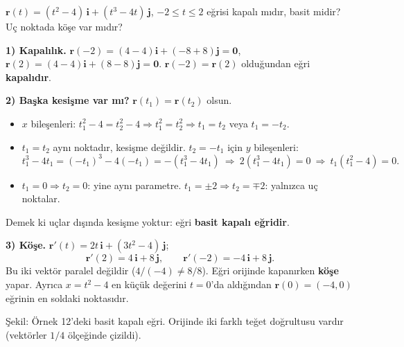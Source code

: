 \begin{soru}
$\mathbf r(t)=(t^2-4)\,\mathbf i+(t^3-4t)\,\mathbf j$, $-2\le t\le2$ eğrisi kapalı mıdır, basit midir? Uç noktada köşe var mıdır?
\end{soru}
\begin{cevap}
\textbf{1) Kapalılık.} $\mathbf r(-2)=(4-4)\mathbf i+(-8+8)\mathbf j=\mathbf 0$, \ $\mathbf r(2)=(4-4)\mathbf i+(8-8)\mathbf j=\mathbf 0$.
$\mathbf r(-2)=\mathbf r(2)$ olduğundan eğri \textbf{kapalıdır}.

\textbf{2) Başka kesişme var mı?} $\mathbf r(t_1)=\mathbf r(t_2)$ olsun.
\begin{itemize}
\item $x$ bileşenleri: $t_1^2-4=t_2^2-4\Rightarrow t_1^2=t_2^2\Rightarrow t_1=t_2$ veya $t_1=-t_2$.
\item $t_1=t_2$ aynı noktadır, kesişme değildir. $t_2=-t_1$ için $y$ bileşenleri:
\[ t_1^3-4t_1=(-t_1)^3-4(-t_1)=-(t_1^3-4t_1)\ \Rightarrow\ 2(t_1^3-4t_1)=0\ \Rightarrow\ t_1(t_1^2-4)=0 . \]
\item $t_1=0\Rightarrow t_2=0$: yine aynı parametre. $t_1=\pm2\Rightarrow t_2=\mp2$: yalnızca uç noktalar.
\end{itemize}
Demek ki uçlar dışında kesişme yoktur: eğri \textbf{basit kapalı eğridir}.

\textbf{3) Köşe.} $\mathbf r'(t)=2t\,\mathbf i+(3t^2-4)\,\mathbf j$;
\[ \mathbf r'(2)=4\,\mathbf i+8\,\mathbf j,\qquad \mathbf r'(-2)=-4\,\mathbf i+8\,\mathbf j . \]
Bu iki vektör paralel değildir ($4/(-4)\neq 8/8$). Eğri orijinde kapanırken \textbf{köşe} yapar. Ayrıca $x=t^2-4$ en küçük değerini $t=0$'da aldığından
$\mathbf r(0)=(-4,0)$ eğrinin en soldaki noktasıdır.
\end{cevap}

\begin{center}

{\small Şekil: Örnek 12'deki basit kapalı eğri. Orijinde iki farklı teğet doğrultusu vardır (vektörler $1/4$ ölçeğinde çizildi).}
\end{center}


